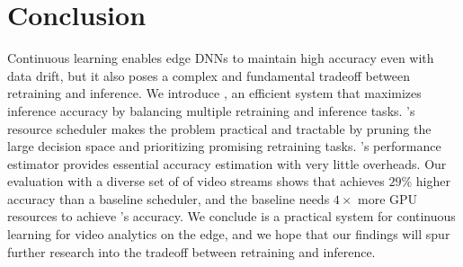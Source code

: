 \section{Conclusion}
\label{sec:ekya_conclusion}


Continuous learning enables edge DNNs to maintain high accuracy even with data drift, but it also poses a complex and fundamental tradeoff between retraining and inference. We introduce {\name}, an efficient system that maximizes inference accuracy by balancing multiple retraining and inference tasks. 
{\name}'s resource scheduler makes the problem practical and tractable by pruning the large decision space and prioritizing promising retraining tasks. {\name}'s performance estimator provides essential accuracy estimation with very little overheads. Our evaluation with a diverse set of of video streams shows that {\name} achieves $29\%$ higher accuracy than a baseline scheduler, and the baseline needs $4\times$ more GPU resources to achieve {\name}'s accuracy. We conclude {\name} is a practical system for continuous learning for video analytics on the edge, and we hope that our findings will spur further research into the tradeoff between retraining and inference.




